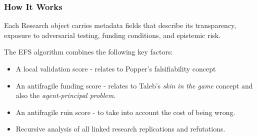 \documentclass{article}
\begin{document}
\subsubsection{How It Works}
Each Research object carries metadata fields that describe its transparency, exposure to adversarial testing, funding conditions, and epistemic risk. 

The EFS algorithm combines the following key factors:
\begin{itemize}
	\item A local validation score - relates to Popper's falsifiability concept
	\item An antifragile funding score - relates to Taleb's \emph{skin in the game} concept and also the \emph{agent-principal problem}.
	\item An antifragile ruin score - to take into account the cost of being wrong.
	\item Recursive analysis of all linked research replications and refutations.
\end{itemize}
\end{document}
